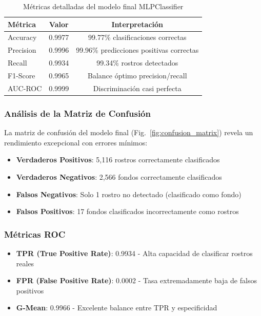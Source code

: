 \documentclass{article}
\begin{document}
\begin{table}[H]
    \centering
    \begin{tabular}{|l|c|c|}
    \hline
    \rowcolor{tableblue} \textbf{Métrica} & \textbf{Valor} & \textbf{Interpretación} \\
    \hline
    Accuracy & 0.9977 & 99.77\% clasificaciones correctas \\
    \hline
    Precision & 0.9996 & 99.96\% predicciones positivas correctas \\
    \hline
    Recall & 0.9934 & 99.34\% rostros detectados \\
    \hline
    F1-Score & 0.9965 & Balance óptimo precision/recall \\
    \hline
    AUC-ROC & 0.9999 & Discriminación casi perfecta \\
    \hline
    \end{tabular}
    \caption{Métricas detalladas del modelo final MLPClassifier}
    \label{tab:metricas_finales}
\end{table}

\subsubsection*{Análisis de la Matriz de Confusión}

La matriz de confusión del modelo final (Fig.~\ref{fig:confusion_matrix}) revela un rendimiento excepcional con errores mínimos:

\begin{itemize}
    \item \textbf{Verdaderos Positivos}: 5,116 rostros correctamente clasificados
    \item \textbf{Verdaderos Negativos}: 2,566 fondos correctamente clasificados
    \item \textbf{Falsos Negativos}: Solo 1 rostro no detectado (clasificado como fondo)
    \item \textbf{Falsos Positivos}: 17 fondos clasificados incorrectamente como rostros
\end{itemize}

\subsubsection*{Métricas ROC}

\begin{itemize}
    \item \textbf{TPR (True Positive Rate)}: 0.9934 - Alta capacidad de clasificar rostros reales
    \item \textbf{FPR (False Positive Rate)}: 0.0002 - Tasa extremadamente baja de falsos positivos
    \item \textbf{G-Mean}: 0.9966 - Excelente balance entre TPR y especificidad
\end{itemize}
\end{document}
